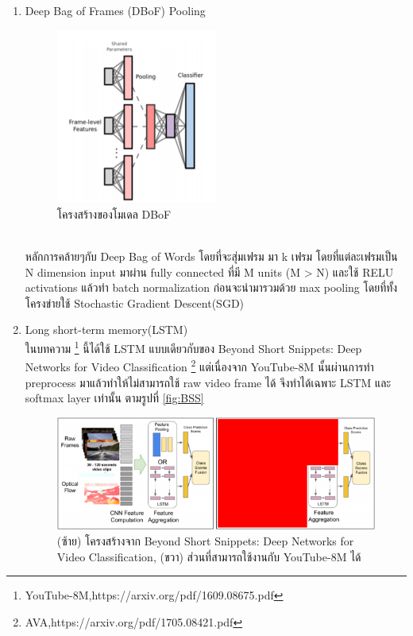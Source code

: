 \begin{enumerate}
\begin{enumerate}
		\item Deep Bag of Frames (DBoF) Pooling
		\begin{figure}[!ht]
			\centering
			\includegraphics[width=0.5\textwidth]{chapter2/images/DBoF.png}
				\caption{โครงสร้างของโมเดล DBoF}
    			\label{fig:DBoF}
		\end{figure}
		\\ หลักการคล้ายๆกับ Deep Bag of Words โดยที่จะสุ่มเฟรม มา k เฟรม โดยที่แต่ละเฟรมเป็น N dimension input มาผ่าน fully connected ที่มี M units (M > N) และใช้ RELU activations แล้วทำ batch normalization ก่อนจะนำมารวมด้วย max pooling โดยที่ทั้งโครงข่ายใช้ Stochastic  Gradient Descent(SGD) 
		\clearpage
		\item Long short-term memory(LSTM)
		\\ ในบทความ \footnote{YouTube-8M,https://arxiv.org/pdf/1609.08675.pdf} นี้ได้ใช้ LSTM แบบเดียวกับของ Beyond Short Snippets: Deep Networks for Video Classification \footnote{AVA,https://arxiv.org/pdf/1705.08421.pdf} แต่เนื่องจาก YouTube-8M นั้นผ่านการทำ preprocess มาแล้วทำให้ไม่สามารถใช้ raw video frame ได้ จึงทำได้เฉพาะ LSTM และ softmax layer เท่านั้น ตามรูปที่ \ref{fig:BSS}
		\begin{figure}[!ht]
			\centering
			\includegraphics[width=1\textwidth]{chapter2/images/BSS.png}
				\caption{(ซ้าย) โครงสร้างจาก Beyond Short Snippets: Deep Networks for Video Classification, (ขวา) ส่วนที่สามารถใช้งานกับ YouTube-8M ได้}

\end{figure}
\end{enumerate}
\end{enumerate}
